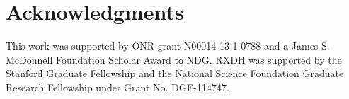 \documentclass[10pt,letterpaper]{article}
\begin{document}

\section{\bf Acknowledgments}
\small
This work was supported by ONR grant N00014-13-1-0788 and a James S. McDonnell Foundation Scholar Award to NDG. RXDH was supported by the Stanford Graduate Fellowship and the National Science Foundation Graduate Research Fellowship under Grant No. DGE-114747.





\setlength{\bibleftmargin}{.125in}
\setlength{\bibindent}{-\bibleftmargin}


\end{document}
